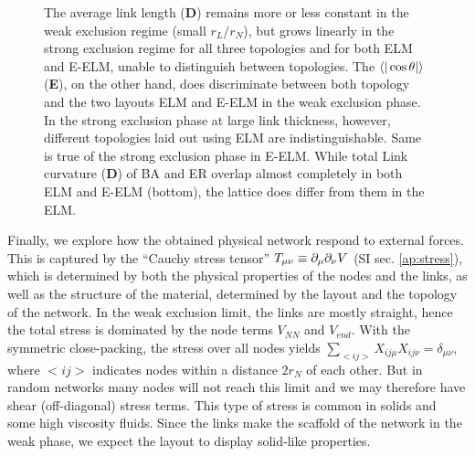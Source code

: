 \documentclass[nofootinbib,preprint,floatfix,titlepage,endfloats]{revtex4} %
\begin{document}
\begin{figure}
{         The average link length ({\bf D})  
         remains more or less constant in the weak exclusion regime (small $r_L/r_N$), but grows linearly in the strong exclusion regime for all three topologies and for both ELM and E-ELM, unable to distinguish between topologies.  
         The $\be{|\cos\theta |}$ ({\bf E}), on the other hand, does discriminate between both topology and the two layouts ELM and E-ELM in the weak exclusion phase. 
         In the strong exclusion phase at large link thickness, however, different topologies laid out using ELM are indistinguishable. Same is true of the strong exclusion phase in E-ELM. 
         While total Link curvature ({\bf D}) of BA and ER overlap almost completely in both ELM and E-ELM (bottom), the lattice does differ from them in the ELM. }    
    \label{fig:phase-compare2}
\end{figure}


Finally, we explore
how the obtained physical network respond to external forces. This is captured by the ``Cauchy stress tensor'' $T_{\mu\nu} \equiv \partial_\mu\partial_\nu V$ \cite{irgens2008continuum} (SI sec. \ref{ap:stress}), which is determined by both the physical properties of the nodes and the links, as well as the 
structure of the material, determined by the layout and the topology of the network. 
In the weak exclusion limit, the links are mostly straight, hence the total stress is dominated by the node terms $V_{NN}$ and $V_{end}$. 
With the symmetric close-packing, the stress over all nodes yields $\sum_{<ij>} X_{ij\mu}X_{ij\nu} = \delta_{\mu\nu}$, where $<ij>$ indicates nodes within a distance $2r_N$ of each other. 
But in random networks many nodes will not reach this limit and we may therefore have shear (off-diagonal) stress terms. This type of stress is common in solids and some high viscosity fluids. Since the links make the scaffold of the network in the weak phase, we expect the layout to display solid-like properties.  
\end{document}
